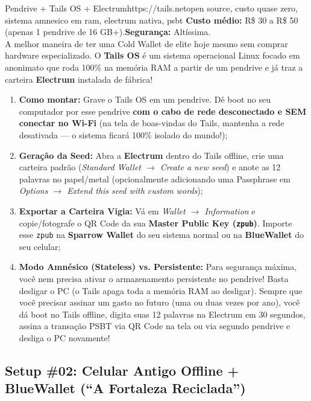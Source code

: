 \documentclass{pousadaguide}
\begin{document}
\begin{ferramenta}[goat,logo=tails,logo2=electrum]{Pendrive + Tails OS + Electrum}{https://tails.net}{open source, custo quase zero, sistema amnesico em ram, electrum nativa, psbt}
\textbf{Custo médio:} R\$ 30 a R\$ 50 (apenas 1 pendrive de 16 GB+).\quad \textbf{Segurança:} Altíssima.\\[1mm]
A melhor maneira de ter uma Cold Wallet de elite hoje mesmo sem comprar hardware especializado. O \textbf{Tails OS} é um sistema operacional Linux focado em anonimato que roda 100\% na memória RAM a partir de um pendrive e já traz a carteira \textbf{Electrum} instalada de fábrica!
\begin{enumerate}
  \item \textbf{Como montar:} Grave o Tails OS em um pendrive. Dê boot no seu computador por esse pendrive \textbf{com o cabo de rede desconectado e SEM conectar no Wi-Fi} (na tela de boas-vindas do Tails, mantenha a rede desativada — o sistema ficará 100\% isolado do mundo!);
  \item \textbf{Geração da Seed:} Abra a \textbf{Electrum} dentro do Tails offline, crie uma carteira padrão (\emph{Standard Wallet $\to$ Create a new seed}) e anote as 12 palavras no papel/metal (opcionalmente adicionando uma Passphrase em \emph{Options $\to$ Extend this seed with custom words});
  \item \textbf{Exportar a Carteira Vigia:} Vá em \emph{Wallet $\to$ Information} e copie/fotografe o QR Code da sua \textbf{Master Public Key (\texttt{zpub})}. Importe esse \texttt{zpub} na \textbf{Sparrow Wallet} do seu sistema normal ou na \textbf{BlueWallet} do seu celular;
  \item \textbf{Modo Amnésico (Stateless) vs. Persistente:} Para segurança máxima, você nem precisa ativar o armazenamento persistente no pendrive! Basta desligar o PC (o Tails apaga toda a memória RAM ao desligar). Sempre que você precisar assinar um gasto no futuro (uma ou duas vezes por ano), você dá boot no Tails offline, digita suas 12 palavras na Electrum em 30 segundos, assina a transação PSBT via QR Code na tela ou via segundo pendrive e desliga o PC novamente!
\end{enumerate}
\end{ferramenta}

\subsection{Setup \#02: Celular Antigo Offline + BlueWallet (“A Fortaleza Reciclada”)}
\end{document}
